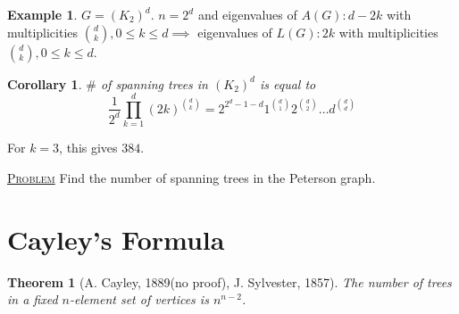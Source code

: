 \documentclass{report}
\newcommand{\fancyem}[1]{\underline{\textsc{#1}}}
\newtheorem{theorem}{Theorem}[section]
\newtheorem{corollary}{Corollary}[section]
\theoremstyle{definition}
\newtheorem{example}{Example}[section]
\theoremstyle{remark}
\numberwithin{equation}{section}
\begin{document}
\begin{example}
    $G = (K_2)^d$.
    $n = 2^d$ and eigenvalues of $A(G): d - 2k$ with multiplicities $\binom{d}{k}, 0 \leq k \leq d \implies$ eigenvalues of $L(G): 2k$ with multiplicities $\binom{d}{k}, 0 \leq k \leq d$.
\end{example}
\begin{corollary}
    $\#$ of spanning trees in $(K_2)^d$ is equal to 
    \[
        \frac{1}{2^d} \prod_{k=1}^d (2k)^{\binom{d}{k}} = 2^{2^d - 1 - d}1^{\binom{d}{1}}2^{\binom{d}{2}}\ldots d^{\binom{d}{d}}     
    \]
\end{corollary}
For $k = 3$, this gives $384$.

\fancyem{Problem} Find the number of spanning trees in the Peterson graph.

\section{Cayley's Formula}
\begin{theorem}[A. Cayley, 1889(no proof), J. Sylvester, 1857]
    The number of trees in a fixed $n$-element set of vertices is $n^{n - 2}$.
\end{theorem}
\end{document}
